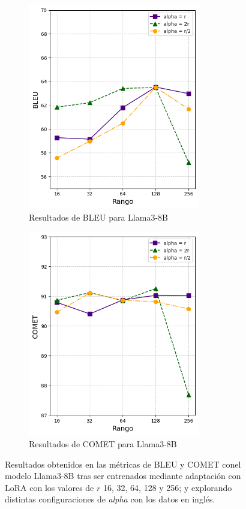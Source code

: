 \documentclass[11pt,spanish,listoffigures,listoftables]{tfgetsinf}
\begin{document}
\begin{figure}
\begin{subfigure}{0.5\textwidth}
\includegraphics[width=0.9\linewidth, height=9cm]{images/llama_BLEU_en} 
\caption{Resultados de BLEU para Llama3-8B}
\label{fig:subim1}
\end{subfigure}
\begin{subfigure}{0.5\textwidth}
\includegraphics[width=0.9\linewidth, height=9cm]{images/llama_COMET_en}
\caption{Resultados de COMET para Llama3-8B}
\label{fig:subim2}
\end{subfigure}

\caption{Resultados obtenidos en las métricas de BLEU y COMET conel modelo Llama3-8B tras ser entrenados mediante adaptación con LoRA con los valores de $r$ 16, 32, 64, 128 y 256;  y explorando distintas configuraciones de \textit{alpha} con los datos en inglés.}
\label{fig:graficasLlama}
\end{figure}
\end{document}
